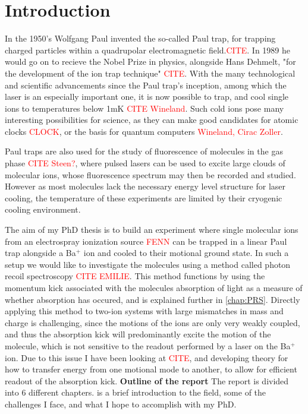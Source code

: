 
\chapter{Introduction}
\label{chap:intro}
In the 1950's Wolfgang Paul invented the so-called Paul trap, for trapping charged particles within a quadrupolar electromagnetic field.\textcolor{red}{CITE}. In 1989 he would go on
 to recieve the Nobel Prize in physics, alongside Hans Dehmelt, "for the development of the ion trap technique" \textcolor{red}{CITE}.
 With the many technological and scientific advancements since the Paul trap's inception, among which the laser is an especially important one,
 it is now possible to trap, and cool single ions to temperatures below 1mK \textcolor{red}{CITE Wineland}.
 Such cold ions pose many interesting possibilities for science, as they can make good candidates for atomic clocks \textcolor{red}{CLOCK},
 or the basis for quantum computers \textcolor{red}{Wineland, Cirac Zoller}.

Paul traps are also used for the study of fluorescence of molecules in the gas phase \textcolor{red}{CITE Steen?},
where pulsed lasers can be used to excite large clouds of molecular ions, whose fluorescence spectrum may then be recorded and studied.
However as most molecules lack the necessary energy level structure for laser cooling, the temperature of these experiments are limited by their cryogenic cooling environment.


The aim of my PhD thesis is to build an experiment where single molecular ions from an electrospray ionization source \textcolor{red}{FENN} can be trapped in a linear Paul trap alongside a Ba$^+$ ion and cooled to their motional ground state.
In such a setup we would like to investigate the molecules using a method called photon recoil spectroscopy \textcolor{red}{CITE EMILIE}. This method functions by using the momentum kick associated with the molecules absorption of light
as a measure of whether absorption has occured, and is explained further in \cref{chap:PRS}. Directly applying this method to two-ion systems with large mismatches in mass and charge is challenging, since the motions of the ions are only very weakly coupled, and thus the absorption kick will predominantly excite the motion of the molecule, which is not sensitive to the readout performed by a laser on the 
Ba$^+$ ion. Due to this issue I have been looking at \textcolor{red}{CITE}, and developing theory for how to transfer energy from one motional mode to another, to allow for efficient readout of the absorption kick.\medskip
\newline
\noindent\Large{\textbf{Outline of the report}}\newline
\normalsize The report is divided into 6 different chapters.  is a brief introduction to the field, some of the challenges I face, and what I hope to accomplish with my PhD.

